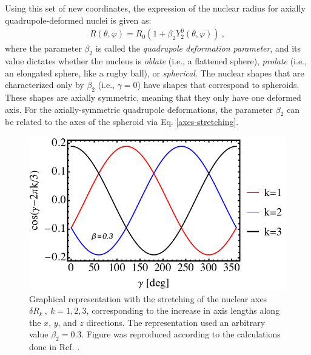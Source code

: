 Using this set of new coordinates, the expression of the nuclear radius for axially quadrupole-deformed nuclei is given as:
\begin{align}
    R(\theta,\varphi)=R_0\left(1+\beta_2 Y_2^0(\theta,\varphi)\right)\ ,
    \label{quadrupole-radius}
\end{align}
where the parameter $\beta_2$ is called the \emph{quadrupole deformation parameter}, and its value dictates whether the nucleus is \emph{oblate} (i.e., a flattened sphere), \emph{prolate} (i.e., an elongated sphere, like a rugby ball), or \emph{spherical}. The nuclear shapes that are characterized only by $\beta_2$ (i.e., $\gamma=0$) have shapes that correspond to spheroids. These shapes are axially symmetric, meaning that they only have one deformed axis. For the axially-symmetric quadrupole deformations, the parameter $\beta_2$ can be related to the axes of the spheroid via Eq. \eqref{axes-stretching}.
\begin{figure}
    \centering
    \includegraphics[scale=0.8]{Chapters/Figures/nuclear-radius-elongation.pdf}
    \caption{Graphical representation with the stretching of the nuclear axes $\delta R_k\ ,\ k=1,2,3$, corresponding to the increase in axis lengths along the $x$, $y$, and $z$ directions. The representation used an arbitrary value $\beta_2=0.3$. Figure was reproduced according to the calculations done in Ref. \cite{greiner1996nuclear}.}
    \label{nuclear-radius-elongation}
\end{figure}

